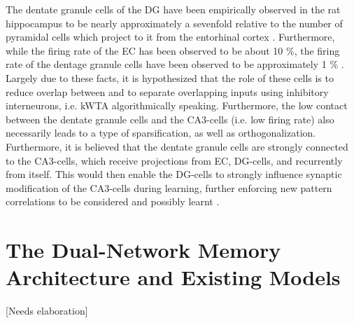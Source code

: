 The dentate granule cells of the DG have been empirically observed in the rat hippocampus to be nearly approximately a sevenfold relative to the number of pyramidal cells which project to it from the entorhinal cortex \citep{Rolls1998chpt6}. Furthermore, while the firing rate of the EC has been observed to be about 10 \%, the firing rate of the dentage granule cells have been observed to be approximately 1 \% \citep{Rolls1998chpt6}.
Largely due to these facts, it is hypothesized that the role of these cells is to reduce overlap between and to separate overlapping inputs using inhibitory interneurons, i.e. kWTA algorithmically speaking. Furthermore, the low contact between the dentate granule cells and the CA3-cells (i.e. low firing rate) also necessarily leads to a type of sparsification, as well as orthogonalization. Furthermore, it is believed that the dentate granule cells are strongly connected to the CA3-cells, which receive projections from EC, DG-cells, and recurrently from itself. This would then enable the DG-cells to strongly influence synaptic modification of the CA3-cells during learning, further enforcing new pattern correlations to be considered and possibly learnt \citep{Rolls1998chpt6}.

\section{The Dual-Network Memory Architecture and Existing Models}\label{chpt:existing-models}[Needs elaboration]

